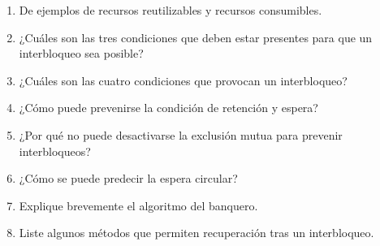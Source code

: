 \begin{enumerate}
  \item De ejemplos de recursos reutilizables y recursos consumibles.
  \item ¿Cuáles son las tres condiciones que deben estar presentes para que un interbloqueo sea posible?
  \item ¿Cuáles son las cuatro condiciones que provocan un interbloqueo?
  \item ¿Cómo puede prevenirse la condición de retención y espera?
  \item ¿Por qué no puede desactivarse la exclusión mutua para prevenir interbloqueos?
  \item ¿Cómo se puede predecir la espera circular?
  \item Explique brevemente el algoritmo del banquero.
  \item Liste algunos métodos que permiten recuperación tras un interbloqueo.
\end{enumerate}
